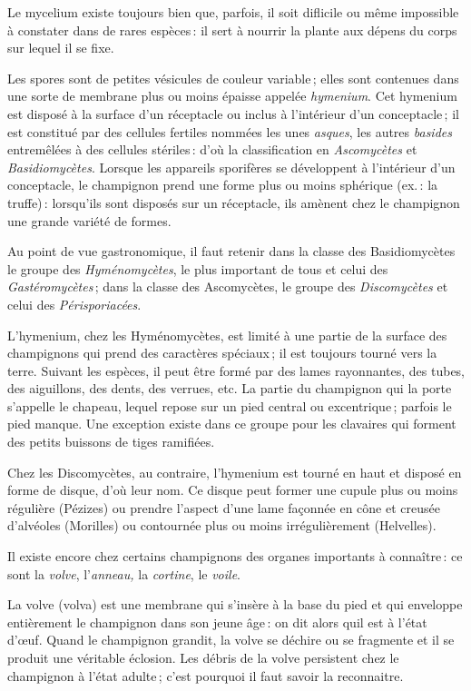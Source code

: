 Le mycelium existe toujours bien que, parfois, il soit diflicile ou même
impossible à constater dans de rares espèces : il sert à nourrir la plante aux
dépens du corps sur lequel il se fixe.

Les spores sont de petites vésicules de couleur variable ; elles sont contenues
dans une sorte de membrane plus ou moins épaisse appelée \textit{hymenium}. Cet
hymenium est disposé à la surface d'un réceptacle ou inclus à l'intérieur d’un
conceptacle ; il est constitué par des cellules fertiles nommées les unes
\textit{asques}, les autres \textit{basides} entremêlées à des cellules
stériles : d'où la classification en \textit{Ascomycètes} et
\textit{Basidiomycètes}. Lorsque les appareils sporifères se développent
à l'intérieur d'un conceptacle, le champignon prend une forme plus ou moins
sphérique (ex. : la truffe) : lorsqu'ils sont disposés sur un réceptacle, ils
amènent chez le champignon une grande variété de formes.

Au point de vue gastronomique, il faut retenir dans la classe des
Basidiomycètes le groupe des \textit{Hyménomycètes}, le plus important de tous
et celui des \textit{Gastéromycètes} ; dans la classe des Ascomycètes, le
groupe des \textit{Discomycètes} et celui des \textit{Périsporiacées}.

L'hymenium, chez les Hyménomycètes, est limité à une partie de la surface des
champignons qui prend des caractères spéciaux ; il est toujours tourné vers la
terre. Suivant les espèces, il peut être formé par des lames rayonnantes, des
tubes, des aiguillons, des dents, des verrues, etc. La partie du champignon qui
la porte s'appelle le chapeau, lequel repose sur un pied central ou
excentrique ; parfois le pied manque. Une exception existe dans ce groupe pour
les clavaires qui forment des petits buissons de tiges ramifiées.

Chez les Discomycètes, au contraire, l'hymenium est tourné en haut et disposé
en forme de disque, d'où leur nom. Ce disque peut former une cupule plus ou
moins régulière (Pézizes) ou prendre l'aspect d'une lame façonnée en cône et
creusée d'alvéoles (Morilles) ou contournée plus ou moins irrégulièrement
(Helvelles).

Il existe encore chez certains champignons des organes importants à connaître :
ce sont la \textit{volve}, l'\textit{anneau,} la \textit{cortine}, le
\textit{voile}.

La volve (volva) est une membrane qui s'insère à la base du pied et qui
enveloppe entièrement le champignon dans son jeune âge : on dit alors quil est
à l'état d'œuf. Quand le champignon grandit, la volve se déchire ou se
fragmente et il se produit une véritable éclosion. Les débris de la volve
persistent chez le champignon à l'état adulte ; c'est pourquoi il faut savoir
la reconnaitre.

